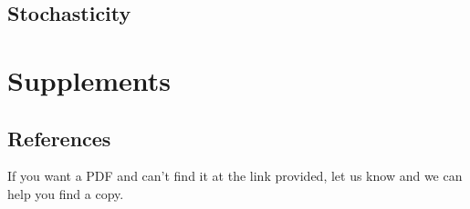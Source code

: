 \documentclass[
]{book}
\begin{document}
\chapter{Stochasticity}\label{stochasticity}

\part{Supplements}\label{part-supplements}

\chapter{References}\label{references}

If you want a PDF and can't find it at the link provided, let us know and we can help you find a copy.
\end{document}
